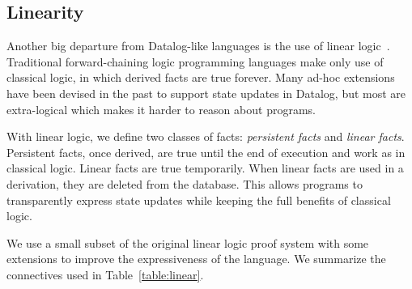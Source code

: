 \subsection{Linearity}

Another big departure from Datalog-like languages is the use of linear logic~\cite{Girard95logic:its}. Traditional forward-chaining logic programming languages make only use of classical logic, in which derived facts are true forever. Many ad-hoc extensions~\cite{Liu98extendingdatalog,Ludascher95alogical} have been devised in the past to support state updates in Datalog, but most are extra-logical which makes it harder to reason about programs.

With linear logic, we define two classes of facts: \emph{persistent facts} and \emph{linear facts}. Persistent facts, once derived, are true until the end of execution and work as in classical logic. Linear facts are true temporarily. When linear facts are used in a derivation, they are deleted from the database. This allows programs to transparently express state updates while keeping the full benefits of classical logic.

We use a small subset of the original linear logic proof system with some extensions to improve
the expressiveness of the language. We summarize the connectives used in Table~\ref{table:linear}.

